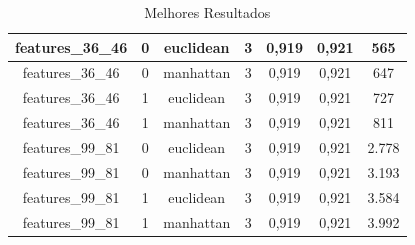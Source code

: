 \documentclass[12pt]{article}
\begin{document}
\begin{table}[!htb]
\begin{tabular}{|c|c|c|c|c|c|c|}
  features\_36\_46    & 0                   & euclidean         & 3          & 0,919             & 0,921            & 565                         \\ \hline
  features\_36\_46    & 0                   & manhattan         & 3          & 0,919             & 0,921            & 647                         \\ \hline
  features\_36\_46    & 1                   & euclidean         & 3          & 0,919             & 0,921            & 727                         \\ \hline
  features\_36\_46    & 1                   & manhattan         & 3          & 0,919             & 0,921            & 811                         \\ \hline
  features\_99\_81    & 0                   & euclidean         & 3          & 0,919             & 0,921            & 2.778                       \\ \hline
  features\_99\_81    & 0                   & manhattan         & 3          & 0,919             & 0,921            & 3.193                       \\ \hline
  features\_99\_81    & 1                   & euclidean         & 3          & 0,919             & 0,921            & 3.584                       \\ \hline
  features\_99\_81    & 1                   & manhattan         & 3          & 0,919             & 0,921            & 3.992                       \\ \hline
  \end{tabular}
  \caption{Melhores Resultados}
  \label{tab:resultados_melhores}
\end{table}
\end{document}
